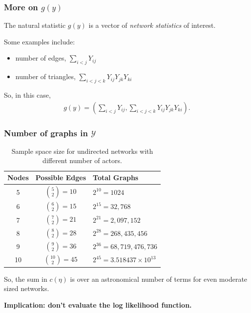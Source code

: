 \documentclass[slidestop,compress, 10pt]{beamer}
\def\YY{{\mathcal Y}}
\begin{document}
\frame
{
\frametitle{More on $g(y)$}
The natural statistic $g(y)$ is a vector of \emph{network statistics} of interest.  
\vspace{2mm}

Some examples include:
\begin{itemize}
	\item number of edges, $\sum_{i<j} Y_{ij}$
	\item number of triangles, $\sum_{i < j < k} Y_{ij}Y_{jk}Y_{ki}$
\end{itemize}
\vspace{2mm}

So, in this case,
\begin{align*}
	g(y) = \left( \sum_{i<j} Y_{ij}, 
					\sum_{i < j < k} Y_{ij}Y_{jk}Y_{ki} \right ).
\end{align*}


}


\frame
{
\frametitle{Number of graphs in $\YY$}
\begin{table}[h] 
\caption{Sample space size for undirected networks with different number of 
actors.}

\begin{tabular}{ccl} 
\hline 
Nodes & Possible Edges & Total Graphs \\ [1ex]
\hline
5 & ${5 \choose 2} = 10$ & $2^{10} = 1024$ \\ [1ex]
6 & ${6 \choose 2} = 15$ & $2^{15} = 32,768$ \\ [1ex]
7 & ${7 \choose 2} = 21$ & $2^{21} = 2,097,152$ \\ [1ex]
8 & ${8 \choose 2} = 28$ & $2^{28} = 268,435,456$ \\ [1ex]
9 & ${9 \choose 2} = 36$ & $2^{36} = 68,719,476,736$ \\ [1ex]
10 & ${10 \choose 2} = 45$ & $2^{45} = 3.518437\times10^{13}$ \\ [1ex]
\hline 
\end{tabular} \label{T:number graphs}
\end{table}
\pause

So, the sum in $c(\eta)$ is over an astronomical number of terms for 
even moderate sized networks.
\vspace{2mm}

\textbf{Implication: don't evaluate the log likelihood function.}
}

\end{document}

